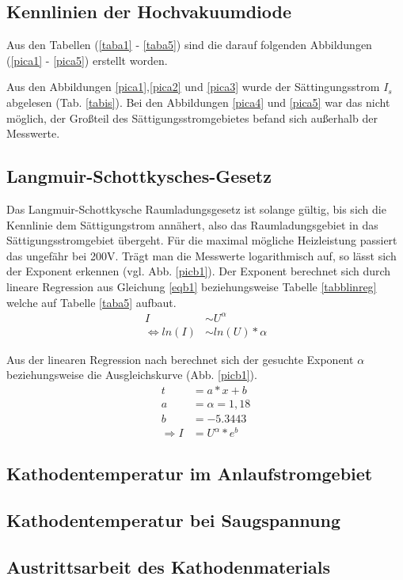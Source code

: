 \subsection{Kennlinien der Hochvakuumdiode} 
Aus den Tabellen (\ref{taba1} - \ref{taba5}) sind die darauf folgenden 
Abbildungen (\ref{pica1} - \ref{pica5}) erstellt worden.
    
     
Aus den Abbildungen \ref{pica1},\ref{pica2} und \ref{pica3} wurde der Sättingungsstrom 
$I_s$ abgelesen (Tab. \ref{tabis}). Bei den Abbildungen \ref{pica4} und \ref{pica5} war das 
nicht möglich, der Großteil des Sättigungsstromgebietes befand sich außerhalb der 
Messwerte.

\FloatBarrier
\subsection{Langmuir-Schottkysches-Gesetz}
Das Langmuir-Schottkysche Raumladungsgesetz ist solange gültig, bis sich die Kennlinie
dem Sättigungstrom annähert, also das Raumladungsgebiet in das Sättigungsstromgebiet 
übergeht. Für die maximal mögliche Heizleistung passiert das ungefähr bei 200V.
Trägt man die Messwerte logarithmisch auf, so lässt sich der Exponent erkennen (vgl. 
Abb. \ref{picb1}). Der Exponent berechnet sich durch lineare Regression \cite{linreg}
aus Gleichung \ref{eqb1} beziehungsweise Tabelle \ref{tabblinreg} welche auf Tabelle \ref{taba5} aufbaut.
\begin{align}
I&\sim U^\alpha \\
\Leftrightarrow ln(I)&\sim ln(U)*\alpha \label{eqb1}
\end{align}

\FloatBarrier
Aus der linearen Regression nach \cite{linreg} berechnet sich der gesuchte Exponent $\alpha$ beziehungsweise die Ausgleichskurve (Abb. \ref{picb1}).
\begin{align}
t&=a*x+b \\
a&=\alpha=1,18 \\
b&=-5.3443 \\
\Rightarrow I&=U^\alpha*e^b 
\end{align}

\FloatBarrier
\subsection{Kathodentemperatur im Anlaufstromgebiet}

\subsection{Kathodentemperatur bei Saugspannung}

\subsection{Austrittsarbeit des Kathodenmaterials}



